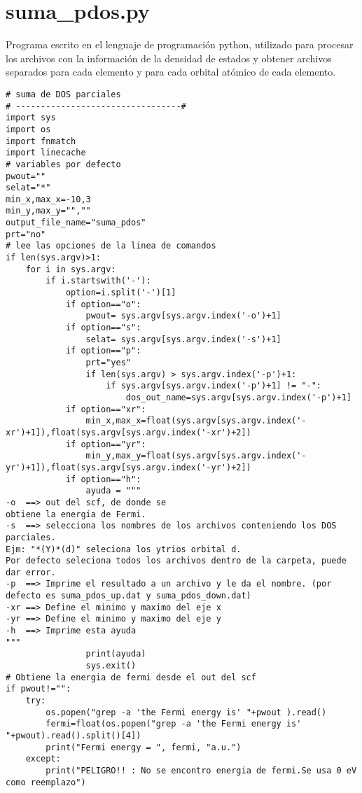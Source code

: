 \section{suma\_pdos.py}

Programa escrito en el lenguaje de programaci\'on python, utilizado para procesar los archivos con la informaci\'on de la densidad de estados y obtener archivos separados para cada elemento y para cada orbital at\'omico de cada elemento.

\lstset{language=Python, breaklines=true}
\begin{lstlisting}
# suma de DOS parciales
# ---------------------------------#
import sys
import os
import fnmatch
import linecache
# variables por defecto
pwout=""
selat="*"
min_x,max_x=-10,3
min_y,max_y="",""
output_file_name="suma_pdos"
prt="no"
# lee las opciones de la linea de comandos
if len(sys.argv)>1:
    for i in sys.argv:
        if i.startswith('-'):
            option=i.split('-')[1]
            if option=="o":
                pwout= sys.argv[sys.argv.index('-o')+1]
            if option=="s":
                selat= sys.argv[sys.argv.index('-s')+1]
            if option=="p":
                prt="yes"
                if len(sys.argv) > sys.argv.index('-p')+1: 
                    if sys.argv[sys.argv.index('-p')+1] != "-": 
                        dos_out_name=sys.argv[sys.argv.index('-p')+1]
            if option=="xr":
                min_x,max_x=float(sys.argv[sys.argv.index('-xr')+1]),float(sys.argv[sys.argv.index('-xr')+2])
            if option=="yr":
                min_y,max_y=float(sys.argv[sys.argv.index('-yr')+1]),float(sys.argv[sys.argv.index('-yr')+2])
            if option=="h":
                ayuda = """
-o  ==> out del scf, de donde se 
obtiene la energia de Fermi.
-s  ==> selecciona los nombres de los archivos conteniendo los DOS parciales.
Ejm: "*(Y)*(d)" seleciona los ytrios orbital d.
Por defecto seleciona todos los archivos dentro de la carpeta, puede dar error.
-p  ==> Imprime el resultado a un archivo y le da el nombre. (por defecto es suma_pdos_up.dat y suma_pdos_down.dat)
-xr ==> Define el minimo y maximo del eje x
-yr ==> Define el minimo y maximo del eje y
-h  ==> Imprime esta ayuda
"""
                print(ayuda)
                sys.exit()
# Obtiene la energia de fermi desde el out del scf
if pwout!="":
    try:
        os.popen("grep -a 'the Fermi energy is' "+pwout ).read()
        fermi=float(os.popen("grep -a 'the Fermi energy is' "+pwout).read().split()[4])
        print("Fermi energy = ", fermi, "a.u.")
    except:
        print("PELIGRO!! : No se encontro energia de fermi.Se usa 0 eV como reemplazo")

\end{lstlisting}
